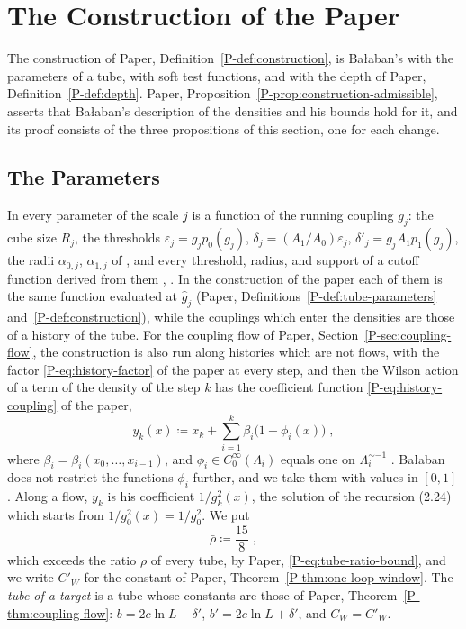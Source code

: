 \documentclass[11pt]{preprint}
\numberwithin{equation}{section}
\theoremstyle{definition}
\theoremstyle{remark}
\theoremstyle{plain}
\begin{document}
\section{The Construction of the Paper}\label{sec:construction}

The construction of Paper, Definition~\ref{P-def:construction}, is Ba{\l}aban's with the parameters of a tube, with soft test functions, and with the depth of Paper, Definition~\ref{P-def:depth}. Paper, Proposition~\ref{P-prop:construction-admissible}, asserts that Ba{\l}aban's description of the densities and his bounds hold for it, and its proof consists of the three propositions of this section, one for each change.

\subsection{The Parameters}\label{sec:parameters}

In \cite{BalabanCRE,BalabanLFR1,BalabanLFR2} every parameter of the scale $j$ is a function of the running coupling $g_j$: the cube size $R_j$, the thresholds $\varepsilon_j = g_jp_0(g_j)$, $\delta_j = (A_1/A_0)\varepsilon_j$, $\delta'_j = g_jA_1p_1(g_j)$, the radii $\alpha_{0,j}$, $\alpha_{1,j}$ of \cite[(2.28), p.~259]{BalabanCRE}, and every threshold, radius, and support of a cutoff function derived from them \cite[(2.4), (2.5), p.~255]{BalabanCRE}, \cite[p.~183]{BalabanLFR1}. In the construction of the paper each of them is the same function evaluated at $\hat g_j$ (Paper, Definitions~\ref{P-def:tube-parameters} and~\ref{P-def:construction}), while the couplings which enter the densities are those of a history of the tube. For the coupling flow of Paper, Section~\ref{P-sec:coupling-flow}, the construction is also run along histories which are not flows, with the factor \eqref{P-eq:history-factor} of the paper at every step, and then the Wilson action of a term of the density of the step $k$ has the coefficient function \eqref{P-eq:history-coupling} of the paper,
\begin{equation}\label{eq:coefficient-function}
    y_k(x) \coloneqq x_k + \sum_{i=1}^{k}\beta_i\bigl(1 - \phi_i(x)\bigr)\;,
\end{equation}
where $\beta_i = \beta_i(x_0, \dots, x_{i-1})$, and $\phi_i \in C_0^\infty(\Lambda_i)$ equals one on $\Lambda_i^{\sim-1}$ \cite[(2.24), p.~259]{BalabanCRE}. Ba{\l}aban does not restrict the functions $\phi_i$ further, and we take them with values in $[0, 1]$. Along a flow, $y_k$ is his coefficient $1/g_k^2(x)$, the solution of the recursion (2.24) which starts from $1/g_0^2(x) = 1/g_0^2$. We put
\begin{equation}\label{eq:action-ratio}
    \bar\rho \coloneqq \frac{15}{8}\;,
\end{equation}
which exceeds the ratio $\rho$ of every tube, by Paper, \eqref{P-eq:tube-ratio-bound}, and we write $C'_W$ for the constant of Paper, Theorem~\ref{P-thm:one-loop-window}. The \emph{tube of a target} is a tube whose constants are those of Paper, Theorem~\ref{P-thm:coupling-flow}: $b = 2c\ln L - \delta'$, $b' = 2c\ln L + \delta'$, and $C_W = C'_W$.
\end{document}
